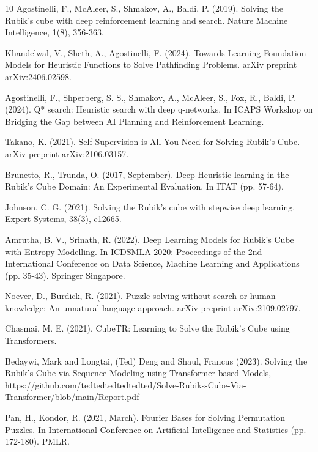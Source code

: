 \documentclass[reqno,11pt]{amsart}
\begin{document}
\begin{thebibliography}{10}
Agostinelli, F., McAleer, S., Shmakov, A.,  Baldi, P. (2019). Solving the Rubik’s cube with deep reinforcement learning and search. Nature Machine Intelligence, 1(8), 356-363.

Khandelwal, V., Sheth, A.,  Agostinelli, F. (2024). Towards Learning Foundation Models for Heuristic Functions to Solve Pathfinding Problems. arXiv preprint arXiv:2406.02598.

Agostinelli, F., Shperberg, S. S., Shmakov, A., McAleer, S., Fox, R., Baldi, P. (2024). Q* search: Heuristic search with deep q-networks. In ICAPS Workshop on Bridging the Gap between AI Planning and Reinforcement Learning.

Takano, K. (2021). Self-Supervision is All You Need for Solving Rubik's Cube. arXiv preprint arXiv:2106.03157.

Brunetto, R.,  Trunda, O. (2017, September). Deep Heuristic-learning in the Rubik's Cube Domain: An Experimental Evaluation. In ITAT (pp. 57-64).


Johnson, C. G. (2021). Solving the Rubik's cube with stepwise deep learning. Expert Systems, 38(3), e12665.

Amrutha, B. V.,  Srinath, R. (2022). Deep Learning Models for Rubik’s Cube with Entropy Modelling. In ICDSMLA 2020: Proceedings of the 2nd International Conference on Data Science, Machine Learning and Applications (pp. 35-43). Springer Singapore.


Noever, D.,  Burdick, R. (2021). Puzzle solving without search or human knowledge: An unnatural language approach. arXiv preprint arXiv:2109.02797.


Chasmai, M. E. (2021). CubeTR: Learning to Solve the Rubik's Cube using Transformers.

Bedaywi, Mark and Longtai, (Ted) Deng and Shaul, Francus (2023). Solving the Rubik’s Cube via Sequence Modeling using
Transformer-based Models, https://github.com/tedtedtedtedtedted/Solve-Rubiks-Cube-Via-Transformer/blob/main/Report.pdf



Pan, H.,  Kondor, R. (2021, March). Fourier Bases for Solving Permutation Puzzles. In International Conference on Artificial Intelligence and Statistics (pp. 172-180). PMLR.


\end{thebibliography}
\end{document}
